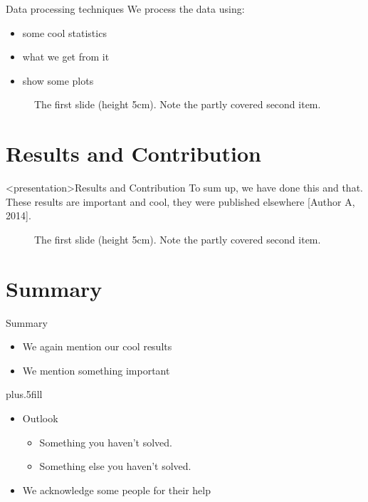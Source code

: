   \begin{frame}{Data processing techniques}
    We process the data using:
    \begin{itemize}
      \item some cool statistics
      \item what we get from it
      \item show some plots
    \end{itemize}
    \label{slide:data_processing}
  \end{frame}


\begin{figure}
  \begin{center}
  \end{center}
  \caption{The first slide (height 5cm). Note the partly covered second item.}
\end{figure}


\section{Results and Contribution}
  \begin{frame}<presentation>{Results and Contribution}
  To sum up, we have done this and that. These results are important and cool,
  they were published elsewhere [Author A, 2014].
  \label{slide:results}
  \end{frame}

\begin{figure}
  \begin{center}
  \end{center}
  \caption{The first slide (height 5cm). Note the partly covered second item.}
\end{figure}

\section*{Summary}
  \begin{frame}{Summary}
    \begin{itemize}
    \item[\cmark] We again mention our cool results
    \item We mention something important
    \end{itemize}
    
    \vskip0pt plus.5fill
    \begin{itemize}
    \item
      Outlook
      \begin{itemize}
      \item[\xmark]
        Something you haven't solved.
      \item
        Something else you haven't solved.
      \end{itemize}
    \item[\ding{43}] We acknowledge some people for their help
    \end{itemize}
  \end{frame}



